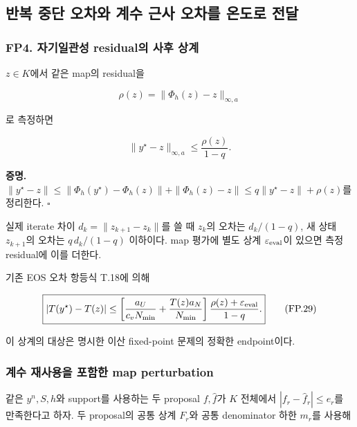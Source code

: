 \documentclass[11pt,a4paper]{article}
\begin{document}
\hypertarget{uxbc18uxbcf5-uxc911uxb2e8-uxc624uxcc28uxc640-uxacc4uxc218-uxadfcuxc0ac-uxc624uxcc28uxb97c-uxc628uxb3c4uxb85c-uxc804uxb2ec}{%
\subsection{반복 중단 오차와 계수 근사 오차를 온도로 전달}\label{uxbc18uxbcf5-uxc911uxb2e8-uxc624uxcc28uxc640-uxacc4uxc218-uxadfcuxc0ac-uxc624uxcc28uxb97c-uxc628uxb3c4uxb85c-uxc804uxb2ec}}

\hypertarget{fp4.-uxc790uxae30uxc77cuxad00uxc131-residualuxc758-uxc0acuxd6c4-uxc0c1uxacc4}{%
\subsubsection{FP4. 자기일관성 residual의 사후 상계}\label{fp4.-uxc790uxae30uxc77cuxad00uxc131-residualuxc758-uxc0acuxd6c4-uxc0c1uxacc4}}

\(z\in K\)에서 같은 map의 residual을

\[
\rho(z)=\|\Phi_h(z)-z\|_{\infty,a}
\]

로 측정하면

\[
\boxed{
\|y^\star-z\|_{\infty,a}
\le\frac{\rho(z)}{1-q}.
}
\tag{FP.28}
\]

\textbf{증명.} \(\|y^\star-z\|\le\|\Phi_h(y^\star)-\Phi_h(z)\|+\|\Phi_h(z)-z\| \le q\|y^\star-z\|+\rho(z)\)를 정리한다. \(\square\)

실제 iterate 차이 \(d_k=\|z_{k+1}-z_k\|\)를 쓸 때 \(z_k\)의 오차는 \(d_k/(1-q)\), 새 상태 \(z_{k+1}\)의 오차는 \(q\,d_k/(1-q)\) 이하이다. map 평가에 별도 상계 \(\varepsilon_{\rm eval}\)이 있으면 측정 residual에 이를 더한다.

기존 EOS 오차 항등식 T.18에 의해

\[
\boxed{
|T(y^\star)-T(z)|
\le
\left[
\frac{a_U}{c_vN_{\min}}
+\frac{T(z)a_N}{N_{\min}}
\right]
\frac{\rho(z)+\varepsilon_{\rm eval}}{1-q}.
}
\tag{FP.29}
\]

이 상계의 대상은 명시한 이산 fixed-point 문제의 정확한 endpoint이다.

\hypertarget{uxacc4uxc218-uxc7acuxc0acuxc6a9uxc744-uxd3ecuxd568uxd55c-map-perturbation}{%
\subsubsection{계수 재사용을 포함한 map perturbation}\label{uxacc4uxc218-uxc7acuxc0acuxc6a9uxc744-uxd3ecuxd568uxd55c-map-perturbation}}

같은 \(y^n,S,h\)와 support를 사용하는 두 proposal \(f,\widehat f\)가 \(K\) 전체에서 \(|f_r-\widehat f_r|\le e_r\)를 만족한다고 하자. 두 proposal의 공통 상계 \(F_r\)와 공통 denominator 하한 \(m_r\)를 사용해
\end{document}
